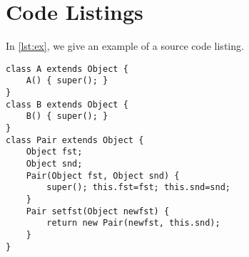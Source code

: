 \section{Code Listings}

In \vref{lst:ex}, we give an example of a source code listing. 

\begin{lstlisting}[style=Java,float=htb,caption={Java source code},label={lst:ex}]
class A extends Object {
	A() { super(); }
}
class B extends Object {
	B() { super(); }
}
class Pair extends Object {
	Object fst;
	Object snd;
	Pair(Object fst, Object snd) {
		super(); this.fst=fst; this.snd=snd;
	}
	Pair setfst(Object newfst) {
		return new Pair(newfst, this.snd);
	}
}
\end{lstlisting}
